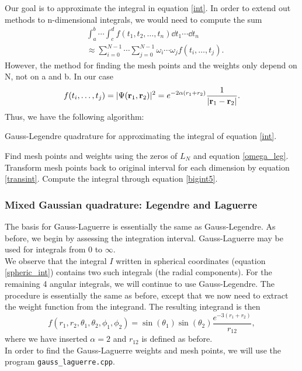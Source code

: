 \documentclass[notitlepage, reprint, nofootinbib]{revtex4-1}
\begin{document}
Our goal is to approximate the integral in equation \ref{int}. In order to extend out methods to n-dimensional integrals, we would need to compute the sum 
\begin{align}
	&\int_a^b \cdots \int_c^d f(t_1,t_2,\ldots,t_n)\dd t_1 \cdots \dd t_n \nonumber\\
	&\approx\sum_{i=0}^{N-1} \cdots \sum_{j=0}^{N-1} \omega_i\cdots \omega_j f(t_i, \ldots, t_j). \label{bigint5}
\end{align}
However, the method for finding the mesh points and the weights only depend on N, not on a and b. In our case
$$f(t_i,\ldots,t_j) = |\Psi(\vb{r}_1, \vb{r}_2)|^2=e^{-2\alpha(r_1+r_2)}\frac{1}{|\vb{r}_1-\vb{r}_2|}.$$ 
\newpage
Thus, we have the following algorithm: 
\begin{algorithm}[H]
	\caption{Gauss-Legendre quadrature for approximating the integral of equation \ref{int}.}
	\begin{algorithmic}[1]
		\State Find mesh points and weights using the zeros of $L_N$ and equation \ref{omega_leg}. 
		\State Transform mesh points back to original interval for each dimension by equation \ref{transint}. 
		\State Compute the integral through equation \ref{bigint5}.
	\end{algorithmic}
\end{algorithm}

\subsubsection{Mixed Gaussian quadrature: Legendre and Laguerre}
The basis for Gauss-Laguerre is essentially the same as Gauss-Legendre. As before, we begin by assessing the integration interval. Gauss-Laguerre may be used for integrals from 0 to $\infty$.\\[2mm]
We observe that the integral $I$ written in spherical coordinates (equation \ref{spheric_int}) contains two such integrals (the radial components). For the remaining 4 angular integrals, we will continue to use Gauss-Legendre. The procedure is essentially the same as before, except that we now need to extract the weight function from the integrand. The resulting integrand is then 
$$f(r_1, r_2, \theta_1, \theta_2, \phi_1, \phi_2) = \sin(\theta_1)\sin(\theta_2)\frac{e^{-3(r_1+r_2)}}{r_{12}},$$
where we have inserted $\alpha=2$ and $r_{12}$ is defined as before.\\[2mm]
In order to find the Gauss-Laguerre weights and mesh points, we will use the program \texttt{gauss\_laguerre.cpp}\cite{gauss-laguerre}.
\end{document}
